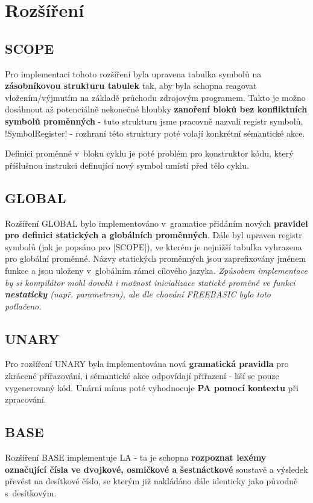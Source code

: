 \section{Rozšíření}
\begin{multicols}{2}

\subsection{SCOPE}
Pro implementaci tohoto rozšíření byla upravena tabulka symbolů na \textbf{zásobníkovou strukturu tabulek} tak, aby byla schopna reagovat vložením/výjmutím na základě průchodu zdrojovým programem.
Takto je možno dosáhnout až potenciálně nekonečné hloubky \textbf{zanoření bloků bez konfliktních symbolů proměnných} - tuto strukturu jsme pracovně nazvali registr symbolů, \ic!SymbolRegister! - rozhraní této struktury poté volají konkrétní sémantické akce.

Definici proměnné v~bloku cyklu je poté problém pro konstruktor kódu, který příšlušnou instrukci definující nový symbol umístí před tělo cyklu.

\subsection{GLOBAL}
Rozšíření GLOBAL bylo implementováno v~gramatice přidáním
nových \textbf{pravidel pro definici statických a globálních proměnných}.
Dále byl upraven registr symbolů (jak je popsáno pro \ic|SCOPE|),
ve kterém je nejnižší tabulka vyhrazena
pro globální proměnné. Názvy statických proměnných jsou zaprefixovány
jménem funkce a jsou uloženy v~globálním rámci cílového jazyka. 
\emph{Způsobem implementace by si kompilátor mohl dovolit i možnost inicializace statické proměné ve funkci \textbf{nestaticky} (např. parametrem), ale dle chování FREEBASIC bylo toto potlačeno.}

\subsection{UNARY}
Pro rozšíření UNARY byla implementována nová \textbf{gramatická pravidla} pro zkrácené přířazování, i sémantické akce odpovídají přiřazení - liší se pouze vygenerovaný kód. Unární mínus poté vyhodnocuje \textbf{PA pomocí kontextu} při zpracování.

\subsection{BASE}
Rozšíření BASE implementuje LA - ta je schopna \textbf{rozpoznat
lexémy označující čísla ve dvojkové, osmičkové a šestnáctkové} soustavě a
výsledek převést na desítkové číslo, se kterým již nakládáno dále identicky jako původně s~desítkovým.


\end{multicols}
